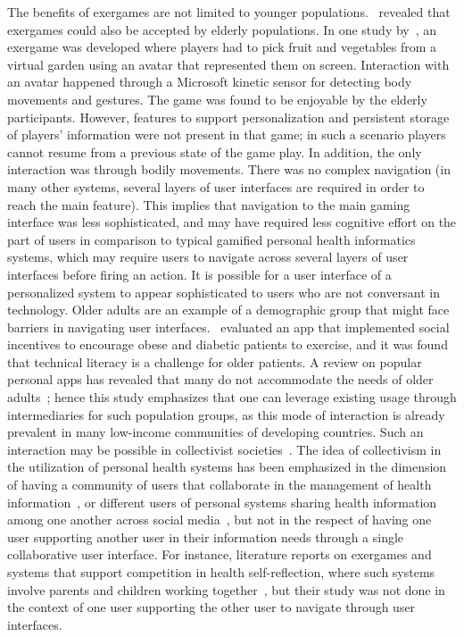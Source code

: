 The benefits of exergames are not limited to younger populations.~\cite{brox2011exergames} revealed that exergames could also be accepted by elderly populations. In one study by~\cite{brauner2013increase}, an exergame was developed where players had to pick fruit and vegetables from a virtual garden using an avatar that represented them on screen. Interaction with an avatar happened through a Microsoft kinetic sensor for detecting body movements and gestures. The game was found to be enjoyable by the elderly participants. However, features to support personalization and persistent storage of players' information were not present in that game; in such a scenario players cannot resume from a previous state of the game play. In addition, the only interaction was through bodily movements. There was no complex navigation (in many other systems, several layers of user interfaces are required in order to reach the main feature). This implies that navigation to the main gaming interface was less sophisticated, and may have required less cognitive effort on the part of users in comparison to typical gamified personal health informatics systems, which may require users to navigate across several layers of user interfaces before firing an action. It is possible for a user interface of a personalized system to appear sophisticated to users who are not conversant in technology. Older adults are an example of a demographic group that might face barriers in navigating user interfaces.~\cite{chen2016social} evaluated an app that implemented social incentives to encourage obese and diabetic patients to exercise, and it was found that technical literacy is a challenge for older patients. A review on popular personal apps has revealed that many do not accommodate the needs of older adults~\citep{silva2014:smartphones}; hence this study emphasizes that one can leverage existing usage through intermediaries for such population groups, as this mode of interaction is already prevalent in many low-income communities of developing countries. Such an interaction may be possible in collectivist societies~\citep{parikh2006}. The idea of collectivism in the utilization of personal health systems has been emphasized in the dimension of having a community of users that collaborate in the management of health information~\citep{colineau2011motivating,grimes2009toward}, or different users of personal systems sharing health information among one another across social media~\citep{ploderer2014social}, but not in the respect of having one user supporting another user in their information needs through a single collaborative user interface. For instance, literature reports on exergames and systems that support competition in health self-reflection, where such systems involve  parents and children working together~\citep{grimes2009toward,saksono2015spaceship}, but their study was not done in the context of one user supporting the other user to navigate through user interfaces.
